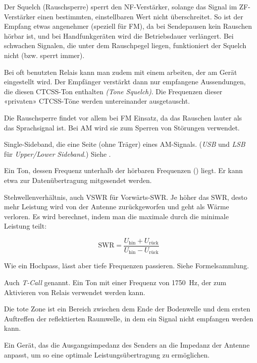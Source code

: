 {Der Squelch (Rauschsperre) sperrt den NF-Verstärker, solange das Signal im ZF-Verstärker einen bestimmten, einstellbaren Wert nicht überschreitet. So ist der Empfang etwas angenehmer (speziell für FM), da bei Sendepausen kein Rauschen hörbar ist, und bei Handfunkgeräten wird die Betriebsdauer verlängert. Bei schwachen Signalen, die unter dem Rauschpegel liegen, funktioniert der Squelch nicht (bzw. sperrt immer).

Bei oft benutzten Relais kann man zudem mit einem  arbeiten, der am Gerät eingestellt wird. Der Empfänger verstärkt dann nur empfangene Aussendungen, die diesen CTCSS-Ton enthalten \textit{(Tone Squelch)}. Die Frequenzen dieser «privaten» CTCSS-Töne werden untereinander ausgetauscht.

Die Rauschsperre findet vor allem bei FM Einsatz, da das Rauschen lauter als das Sprachsignal ist. Bei AM wird sie zum Sperren von Störungen verwendet.}

{Single-Sideband, die eine Seite (ohne Träger) eines AM-Signals. (\textit{USB} und \textit{LSB} für \textit{Upper/Lower Sideband}.) Siehe .}

{Ein Ton, dessen Frequenz unterhalb der hörbaren Frequenzen () liegt. Er kann etwa zur Datenübertragung mitgesendet werden.}

{Stehwellenverhältnis, auch VSWR für Vorwärts-SWR. Je höher das SWR, desto mehr Leistung wird von der Antenne zurückgeworfen und geht als Wärme verloren. Es wird berechnet, indem man die maximale durch die minimale Leistung teilt:

\[\mathrm{SWR} = \frac{U_\mathrm{hin} + U_\mathrm{rück}}{U_\mathrm{hin}-U_\mathrm{rück}}\]
}

{Wie ein Hochpass, lässt aber tiefe Frequenzen passieren. Siehe Formelsammlung.}

{Auch \textit{T-Call} genannt. Ein Ton mit einer Frequenz von 1750 Hz, der zum Aktivieren von Relais verwendet werden kann.}

{Die tote Zone ist ein Bereich zwischen dem Ende der Bodenwelle und dem ersten Auftreffen der reflektierten Raumwelle, in dem ein Signal nicht empfangen werden kann.}

{Ein Gerät, das die Ausgangsimpedanz des Senders an die Impedanz der Antenne anpasst, um so eine optimale Leistungsübertragung zu ermöglichen.}

